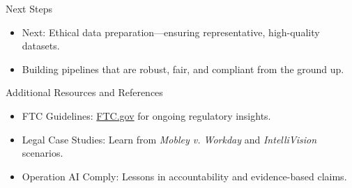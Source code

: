 \documentclass[aspectratio=169]{beamer}
\begin{document}
\begin{frame}{Next Steps}
\begin{itemize}
\item Next: Ethical data preparation—ensuring representative, high-quality datasets.
\item Building pipelines that are robust, fair, and compliant from the ground up.
\end{itemize}
\end{frame}

\begin{frame}{Additional Resources and References}
\begin{itemize}
\item FTC Guidelines: \href{https://www.ftc.gov/}{FTC.gov} for ongoing regulatory insights.
\item Legal Case Studies: Learn from \textit{Mobley v. Workday} and \textit{IntelliVision} scenarios.
\item Operation AI Comply: Lessons in accountability and evidence-based claims.
\end{itemize}
\end{frame}
\end{document}
